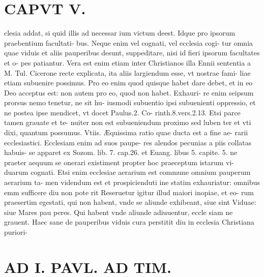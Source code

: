 \documentclass{article}
\begin{document}
\begin{pages}
\section*{CAPVT  V. }
\marginpar{[ p.303 ]}\pstart clesia addat, si quid illis ad necessar ium victum deest. Idque pro ipsorum praebentium facultati- bus. Neque enim vel cognati, vel ecclesia cogi- tur omnia quae viduis et aliis pauperibus desunt, suppeditare, nisi id fieri ipsorum facultates et o- pes patiantur. Vera est enim etiam inter Christianos illa Ennii sententia a M. Tul. Cicerone recte explicata, ita aliis largiendum esse, vt nostrae fami- liae etiam subuenire possimus. Pro eo enim quod quisque habet dare debet, et in eo Deo acceptus est: non autem pro eo, quod non habet. Exhauri- re enim seipsum prorsus nemo tenetur, ne sit hu- iusmodi subuentio ipsi subuenienti oppressio, et ne postea ipse mendicet, vt docet Paulus.2. Co- rinth.8.vers.2.13. Etsi parce tamen grauate et te- nuiter non est subueniendum proximo sed luben ter et vti dixi, quantum possumus. Vtiis. Æquissima ratio quae ducta est a fine ae- rarii ecclesiastici. Ecclesiam enim ad suos paupe- res alendos pecunias a piis collatas habuis- se apparet ex Sozom. lib.  7. cap.26. et Euang. libus  5. capite. 5. ne praeter aequum se onerari existiment propter hoc praeceptum istarum vi- duarum cognati. Etsi enim ecclesiae aerarium est commune omnium pauperum aerarium ta- men videndum est et prospicienduti ine statim exhauriatur: omnibus emm sufficere diu non pote rit Reseruetur igitur illud maiori inopiae, et eo- rum praesertim egestati, qui non habent, vnde se aliunde exhibeant, siue sint Viduae: siue Mares pau peres. Qui habent vnde aliunde adiuuentur, eccle siam ne grauent. Haec sane de pauperibus viduis cura perstitit diu in ecclesia Christiana puriori-  \pend
\section*{AD I. PAVL. AD TIM. }
\marginpar{[ p.304 ]}\pstart {}
{}

\end{pages}
\end{document}
